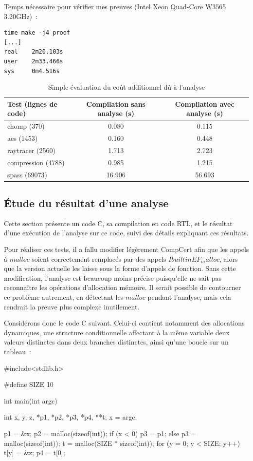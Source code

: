 \documentclass{article}
\begin{document}
Temps nécessaire pour vérifier mes preuves (Intel Xeon Quad-Core W3565
3.20GHz)~:

\begin{verbatim}
time make -j4 proof
[...]
real    2m20.103s
user    2m33.466s
sys     0m4.516s
\end{verbatim}

\begin{table}[!h]
\label{performance}
\caption{Simple évaluation du coût additionnel dû à l'analyse}
\centering
\begin{tabular}{|l|c|c|}
\hline
Test (lignes de code)&
Compilation sans analyse (s)&
Compilation avec analyse (s)\\
\hline
chomp (370) & 0.080 & 0.115\\
aes (1453) & 0.160 & 0.448\\
raytracer (2560) & 1.713 & 2.723\\
compression (4788) & 0.985 & 1.215\\
spass (69073) & 16.906 & 56.693\\
\hline
\end{tabular}
\end{table}

\subsection{Étude du résultat d'une analyse}

Cette section présente un code C, sa compilation en code RTL, et le résultat
d'une exécution de l'analyse sur ce code, suivi des détails expliquant ces
résultats.

Pour réaliser ces tests, il a fallu modifier légèrement CompCert afin que les
appels à $malloc$ soient correctement remplacés par des appels
$Ibuiltin EF_malloc$, alors que la version actuelle les laisse sous
la forme d'appels de fonction. Sans cette modification, l'analyse est beaucoup
moins précise puisqu'elle ne sait pas reconnaître les opérations d'allocation
mémoire. Il serait possible de contourner ce problème autrement, en détectant
les $malloc$ pendant l'analyse, mais cela rendrait la preuve plus
complexe inutilement.

Considérons donc le code C suivant. Celui-ci contient notamment des allocations
dynamiques, une structure conditionnelle affectant à la même variable deux
valeurs distinctes dans deux branches distinctes, ainsi qu'une boucle sur un
tableau~:

\begin{cc}
#include<stdlib.h>

#define SIZE 10

int main(int argc) {
int x, y, z, *p1, *p2, *p3, *p4, **t;
x = argc;

p1 = &x;
p2 = malloc(sizeof(int));
if (x < 0) {
  p3 = p1;
} else {
  p3 = malloc(sizeof(int));
}
t = malloc(SIZE * sizeof(int));
for (y = 0; y < SIZE; y++)
{
  t[y] = &z;
}
p4 = t[0];
}
\end{cc}
\end{document}
